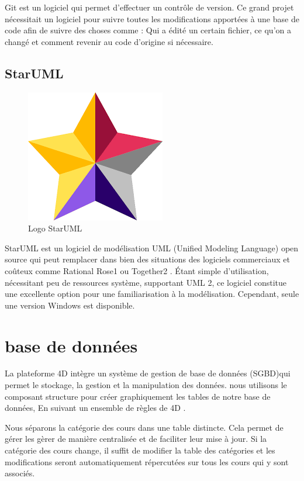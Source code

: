 Git est un logiciel qui permet d’effectuer un contrôle de
 version. Ce grand projet nécessitait un 
 logiciel pour suivre toutes les modifications apportées à une base de code afin de suivre des choses comme : Qui a édité un certain fichier, ce qu'on a changé et comment revenir au code d'origine si nécessaire.

 \subsection{StarUML}

 \begin{figure}[H]
    \centering
    \includegraphics[scale=0.4]{Logos/starUml.png}
    \caption{Logo  StarUML}
\end{figure}
 
 StarUML est un logiciel de modélisation UML (Unified Modeling Language) open source
qui peut remplacer dans bien des situations des logiciels commerciaux et coûteux
comme Rational Rose1 ou Together2
. Étant simple d’utilisation, nécessitant peu de
ressources système, supportant UML 2, ce logiciel constitue une excellente option pour
une familiarisation à la modélisation. Cependant, seule une version Windows est disponible. \cite{StarUml}

\section{base de données }

La plateforme 4D intègre un système de gestion de base de données (SGBD)qui permet le stockage, la gestion et la manipulation des données. nous  utilisons le composant structure pour créer graphiquement les tables de notre base de données, En suivant  un ensemble de règles de 4D .

Nous  séparons la catégorie des cours dans une table distincte. Cela permet de gérer les gèrer  de manière centralisée et de faciliter leur mise à jour. Si la catégorie des cours change, il suffit de modifier la table des catégories et les modifications seront automatiquement répercutées sur tous les cours qui y sont associés.

